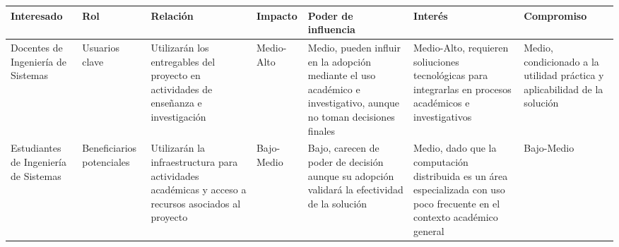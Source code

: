 \begin{table}[H]
	\centering
	\fontsize{7}{7}\selectfont %
	\setlength{\tabcolsep}{3pt} %
	\renewcommand{\arraystretch}{1.4} %
	\begin{tabularx}{\textwidth}{%
		>{\raggedright\arraybackslash}p{1.7cm}  %
		>{\raggedright\arraybackslash}p{1.5cm}    %
		>{\raggedright\arraybackslash}p{2.3cm}  %
		>{\raggedright\arraybackslash}p{1.4cm}  %
		>{\raggedright\arraybackslash}p{2.0cm}  %
		>{\raggedright\arraybackslash}p{2.5cm}    %
		>{\raggedright\arraybackslash}p{2.0cm}} %
		\toprule
		\textbf{Interesado}                     & \textbf{Rol}               & \textbf{Relación}                                                                                      & \textbf{Impacto} & \textbf{Poder de influencia}                                                                   					   & \textbf{Interés}                                                                                                                          & \textbf{Compromiso}                                                                                	 \\
		\midrule
		Docentes de Ingeniería de Sistemas      & Usuarios clave             & Utilizarán los entregables del proyecto en actividades de enseñanza e investigación                    & Medio-Alto       & Medio, pueden influir en la adopción mediante el uso académico e investigativo, aunque no toman decisiones finales  & Medio-Alto, requieren soliuciones tecnológicas para integrarlas en procesos académicos e investigativos                                   & Medio, condicionado a la utilidad práctica y aplicabilidad de la solución                          	  \\
		\midrule
		Estudiantes de Ingeniería de Sistemas   & Beneficiarios potenciales  & Utilizarán la infraestructura para actividades académicas y acceso a recursos asociados al proyecto   & Bajo-Medio       & Bajo, carecen de poder de decisión aunque su adopción validará la efectividad de la solución   					   & Medio, dado que la computación distribuida es un área especializada con uso poco frecuente en el contexto académico general               & Bajo-Medio                                                                                                \\

\end{tabularx}
\end{table}
